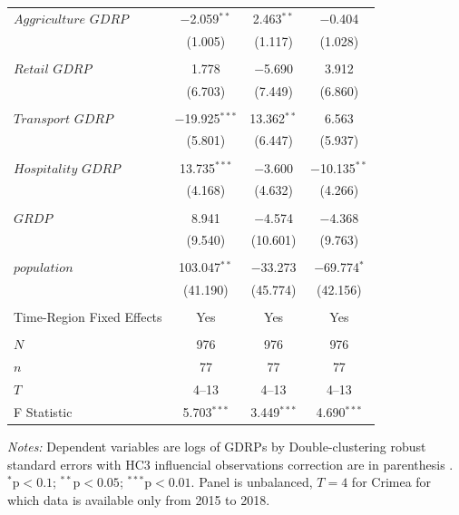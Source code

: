 \documentclass[12pt]{article}
\numberwithin{equation}{section}
\numberwithin{table}{section}
\numberwithin{figure}{section}
\begin{document}
\begin{table}[!htbp]
\begin{threeparttable}
\begin{tabular}{@{\extracolsep{5pt}}lccc}
 $\textit{Aggriculture GDRP}$ & $-$2.059$^{**}$ & 2.463$^{**}$ & $-$0.404 \\ 
  & (1.005) & (1.117) & (1.028) \\ 
  & & & \\ 
 $\textit{Retail GDRP}$ & 1.778 & $-$5.690 & 3.912 \\ 
  & (6.703) & (7.449) & (6.860) \\ 
  & & & \\ 
 $\textit{Transport GDRP}$ & $-$19.925$^{***}$ & 13.362$^{**}$ & 6.563 \\ 
  & (5.801) & (6.447) & (5.937) \\ 
  & & & \\ 
 $\textit{Hospitality GDRP}$& 13.735$^{***}$ & $-$3.600 & $-$10.135$^{**}$ \\ 
  & (4.168) & (4.632) & (4.266) \\ 
  & & & \\ 
  $\textit{GRDP}$ & 8.941 & $-$4.574 & $-$4.368 \\ 
  & (9.540) & (10.601) & (9.763) \\ 
  & & & \\ 
 $\textit{population}$ & 103.047$^{**}$ & $-$33.273 & $-$69.774$^{*}$ \\ 
  & (41.190) & (45.774) & (42.156) \\ 
  & & & \\ 
  Time-Region Fixed Effects & Yes& Yes& Yes \\
  \hline \\[-1.8ex] 
  $N$ & 976 & 976 & 976 \\ 
  $n$ & 77& 77& 77\\
  $T$ & 4--13 & 4--13& 4--13\\
  F Statistic & 5.703$^{***}$ & 3.449$^{***}$ & 4.690$^{***}$ \\ 
  \hline 
  \hline 
  \end{tabular} 
  \begin{tablenotes}[flushleft]
    \item \textit{Notes:} Dependent variables are logs of GDRPs by  Double-clustering robust standard errors with HC3 influencial observations correction are in parenthesis \citep{Thompson2011,Cameron2011}. $^{*}\mathrm{p}<0.1$; $^{**}\mathrm{p}<0.05$; $^{***}\mathrm{p}<0.01$. Panel is unbalanced, $T=4$ for Crimea for which data is available only from 2015 to 2018.
  \end{tablenotes}
\end{threeparttable}
  \end{table} 
\end{document}
